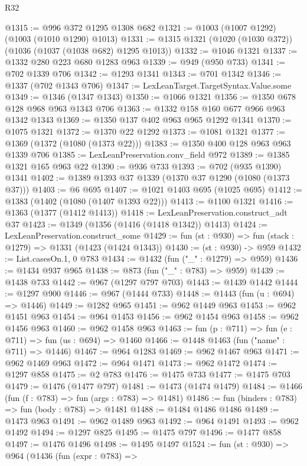 \begin{lexlean}{R32}
\begin{coremodule}
@1315 := @996 @372 @1295 @1308 @682
@1321 := @1003 (@1007 @1292) (@1003 (@1010 @1290) @1013)
@1331 := @1315 @1321 (@1020 (@1030 @372)) (@1036 (@1037 (@1038 @682) @1295 @1013))
@1332 := @1046 @1321
@1337 := @1332 @280 @223 @680 @1283 @963
@1339 := @949 (@950 @733)
@1341 := @702 @1339 @706
@1342 := @1293 @1341
@1343 := @701 @1342
@1346 := @1337 (@702 @1343 @706)
@1347 := LexLeanTarget.TargetSyntax.Value.some
@1349 := @1346 (@1347 @1343)
@1350 := @1066 @1321
@1356 := @1350 @678 @128 @968 @963 @1343 @706
@1363 := @1332 @158 @160 @677 @966 @963 @1342 @1343
@1369 := @1350 @137 @402 @963 @965 @1292 @1341
@1370 := @1075 @1321
@1372 := @1370 @22 @1292
@1373 := @1081 @1321
@1377 := @1369 (@1372 (@1080 (@1373 @22)))
@1383 := @1350 @400 @128 @963 @963 @1339 @706
@1385 := LexLeanPreservation.conv_field @972
@1389 := @1385 @1321 @165 @963 @22
@1390 := @936 @733
@1393 := @702 (@935 @1390) @1341
@1402 := @1389 @1393 @37 @1339 (@1370 @37 @1290 (@1080 (@1373 @37)))
@1403 := @6 @695
@1407 := @1021 @1403 @695 (@1025 @695)
@1412 := @1383 (@1402 (@1080 (@1407 @1393 @22)))
@1413 := @1100 @1321
@1416 := @1363 (@1377 (@1412 @1413))
@1418 := LexLeanPreservation.construct_adt @37
@1423 := @1349 (@1356 (@1416 (@1418 @1342)) @1413)
@1424 := LexLeanPreservation.construct_some
@1429 := fun (st : @930) => fun (stack : @1279) => @1331 (@1423 (@1424 @1343))
@1430 := (st : @930) -> @959
@1432 := List.casesOn.{1, 0} @783
@1434 := @1432 (fun ("_" : @1279) => @959)
@1436 := @1434 @937 @965
@1438 := @873 (fun ("_" : @783) => @959)
@1439 := @1438 @733
@1442 := @967 (@1297 @797 @703)
@1443 := @1439 @1442
@1444 := @1297 @900
@1446 := @967 (@1444 @733)
@1448 := @1443 (fun (u : @694) => @1446)
@1449 := @1282 @965
@1451 := @962 @1449 @963
@1453 := @962 @1451 @963
@1454 := @964 @1453
@1456 := @962 @1454 @963
@1458 := @962 @1456 @963
@1460 := @962 @1458 @963
@1463 := fun (p : @711) => fun (e : @711) => fun (us : @694) => @1460
@1466 := @1448 @1463 (fun ("name" : @711) => @1446)
@1467 := @964 @1283
@1469 := @962 @1467 @963
@1471 := @962 @1469 @963
@1472 := @964 @1471
@1473 := @962 @1472
@1474 := @1297 @858
@1475 := @2 @783
@1476 := @1475 @733
@1477 := @1475 @703
@1479 := @1476 (@1477 @797)
@1481 := @1473 (@1474 @1479)
@1484 := @1466 (fun (f : @783) => fun (args : @783) => @1481)
@1486 := fun (binders : @783) => fun (body : @783) => @1481
@1488 := @1484 @1486 @1486
@1489 := @1473 @963
@1491 := @962 @1489 @963
@1492 := @964 @1491
@1493 := @962 @1492
@1494 := @1297 @825
@1495 := @1475 @797
@1496 := @1477 @858
@1497 := @1476 @1496
@1498 := @1495 @1497
@1524 := fun (st : @930) =>
  @964
    (@1436
      (fun (expr : @783) =>

\end{coremodule}
\end{lexlean}
